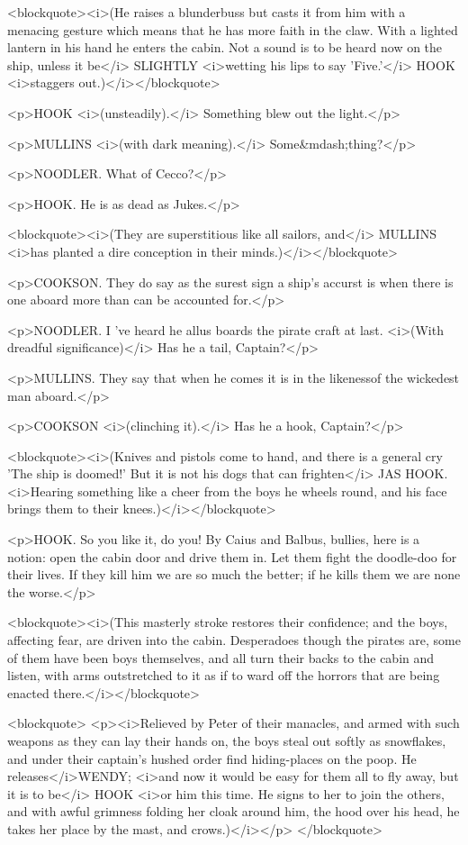 <blockquote><i>(He raises a blunderbuss but casts it from him with a
menacing gesture which means that he has more faith in the claw. With
a lighted lantern in his hand he enters the cabin. Not a sound is to
be heard now on the ship, unless it be</i> SLIGHTLY <i>wetting his
lips to say 'Five.'</i> HOOK <i>staggers out.)</i></blockquote>

<p>HOOK <i>(unsteadily).</i> Something blew out the light.</p>

<p>MULLINS <i>(with dark meaning).</i> Some&mdash;thing?</p>

<p>NOODLER. What of Cecco?</p>

<p>HOOK. He is as dead as Jukes.</p>

<blockquote><i>(They are superstitious like all sailors, and</i>
MULLINS <i>has planted a dire conception in their
minds.)</i></blockquote>

<p>COOKSON. They do say as the surest sign a ship's accurst is when
there is one aboard more than can be accounted for.</p>

<p>NOODLER. I 've heard he allus boards the pirate craft at last.
<i>(With dreadful significance)</i> Has he a tail, Captain?</p>

<p>MULLINS. They say that when he comes it is in the likenessof the
wickedest man aboard.</p>

<p>COOKSON <i>(clinching it).</i> Has he a hook, Captain?</p>

<blockquote><i>(Knives and pistols come to hand, and there is a
general cry 'The ship is doomed!' But it is not his dogs that can
frighten</i> JAS HOOK. <i>Hearing something like a cheer from the
boys he wheels round, and his face brings them to their
knees.)</i></blockquote>

<p>HOOK. So you like it, do you! By Caius and Balbus, bullies, here
is a notion: open the cabin door and drive them in. Let them fight
the doodle-doo for their lives. If they kill him we are so much the
better; if he kills them we are none the worse.</p>

<blockquote><i>(This masterly stroke restores their confidence; and
the boys, affecting fear, are driven into the cabin. Desperadoes
though the pirates are, some of them have been boys themselves, and
all turn their backs to the cabin and listen, with arms outstretched
to it as if to ward off the horrors that are being enacted
there.</i></blockquote>

<blockquote>
<p><i>Relieved by Peter of their manacles, and armed with such
weapons as they can lay their hands on, the boys steal out softly as
snowflakes, and under their captain's hushed order find hiding-places
on the poop. He releases</i>WENDY; <i>and now it would be easy for
them all to fly away, but it is to be</i> HOOK <i>or him this time.
He signs to her to join the others, and with awful grimness folding
her cloak around him, the hood over his head, he takes her place by
the mast, and crows.)</i></p>
</blockquote>

